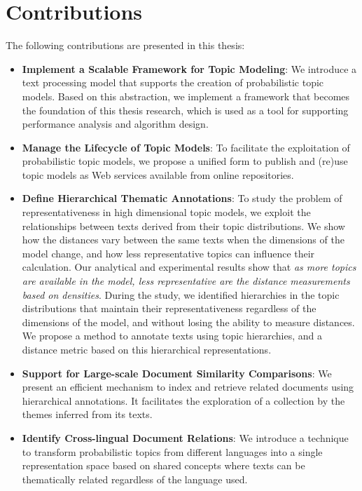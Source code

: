 \section{Contributions}

The following contributions are presented in this thesis:

\begin{itemize}
\item \textbf{Implement a Scalable Framework for Topic Modeling}: We introduce a text processing model that supports the creation of probabilistic topic models. Based on this abstraction, we implement a framework that becomes the foundation of this thesis research, which is used as a tool for supporting performance analysis and algorithm design.
\item \textbf{Manage the Lifecycle of Topic Models}: To facilitate the exploitation of probabilistic topic models, we propose a unified form to publish and (re)use topic models as Web services available from online repositories.
\item \textbf{Define Hierarchical Thematic Annotations}: To study the problem of representativeness in high dimensional topic models, we exploit the relationships between texts derived from their topic distributions. We show how the distances vary between the same texts when the dimensions of the model change, and how less representative topics can influence their calculation. Our analytical and experimental results show that \textit{as more topics are available in the model, less representative are the distance measurements based on densities}. During the study, we identified hierarchies in the topic distributions that maintain their representativeness regardless of the dimensions of the model, and without losing the ability to measure distances. We propose a method to annotate texts using topic hierarchies, and a distance metric based on this hierarchical representations.
\item \textbf{Support for Large-scale Document Similarity Comparisons}: We present an efficient mechanism to index and retrieve related documents using hierarchical annotations. It facilitates the exploration of a collection by the themes inferred from its texts.
\item \textbf{Identify Cross-lingual Document Relations}: We introduce a technique to transform probabilistic topics from different languages into a single representation space based on shared concepts where texts can be thematically related regardless of the language used.
\end{itemize}

